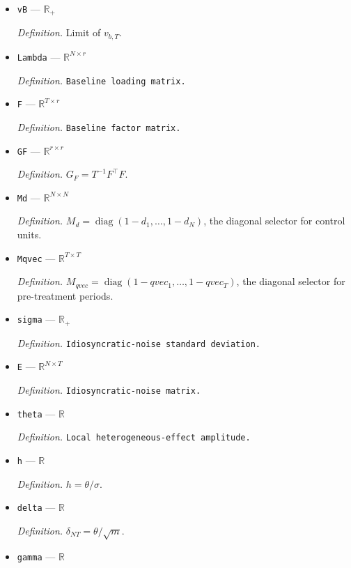 \documentclass{article}
\begin{document}
\begin{itemize}
  \par\smallskip\noindent\emph{Definition.} Limit of \(\mu_{b,T}\).
  \item \texttt{vB} --- \(\mathbb R_{+}\)
  \par\smallskip\noindent\emph{Definition.} Limit of \(v_{b,T}\).
  \item \texttt{Lambda} --- \(\mathbb R^{N\times r}\)
  \par\smallskip\noindent\emph{Definition.} \texttt{Baseline loading matrix.}
  \item \texttt{F} --- \(\mathbb R^{T\times r}\)
  \par\smallskip\noindent\emph{Definition.} \texttt{Baseline factor matrix.}
  \item \texttt{GF} --- \(\mathbb R^{r\times r}\)
  \par\smallskip\noindent\emph{Definition.} \(G_F=T^{-1}F^{\top}F\).
  \item \texttt{Md} --- \(\mathbb R^{N\times N}\)
  \par\smallskip\noindent\emph{Definition.} \(M_d=\operatorname{diag}(1-d_1,\ldots,1-d_N)\), the diagonal selector for control units.
  \item \texttt{Mqvec} --- \(\mathbb R^{T\times T}\)
  \par\smallskip\noindent\emph{Definition.} \(M_{qvec}=\operatorname{diag}(1-qvec_1,\ldots,1-qvec_T)\), the diagonal selector for pre-treatment periods.
  \item \texttt{sigma} --- \(\mathbb R_{+}\)
  \par\smallskip\noindent\emph{Definition.} \texttt{Idiosyncratic-\allowbreak{}noise standard deviation.}
  \item \texttt{E} --- \(\mathbb R^{N\times T}\)
  \par\smallskip\noindent\emph{Definition.} \texttt{Idiosyncratic-\allowbreak{}noise matrix.}
  \item \texttt{theta} --- \(\mathbb R\)
  \par\smallskip\noindent\emph{Definition.} \texttt{Local heterogeneous-\allowbreak{}effect amplitude.}
  \item \texttt{h} --- \(\mathbb R\)
  \par\smallskip\noindent\emph{Definition.} \(h=\theta/\sigma\).
  \item \texttt{delta} --- \(\mathbb R\)
  \par\smallskip\noindent\emph{Definition.} \(\delta_{NT}=\theta/\sqrt m\).
  \item \texttt{gamma} --- \(\mathbb R\)

\end{itemize}
\end{document}

